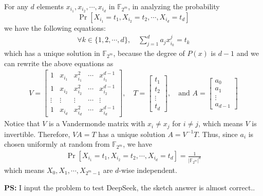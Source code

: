 \begin{answer}
        For any $d$ elements $x_{i_1}, x_{i_2}, \cdots, x_{i_d}$ in $\mathbb F_{2^m}$, in analyzing the probability
        \[
            \Pr[X_{i_1} = t_1, X_{i_2} = t_2, \cdots, X_{i_d} = t_d]
        \]
        we have the following equations: 
        \begin{align*}
            \forall k \in \{1, 2, \cdots, d\}, \quad \sum_{j=1}^{d} a_j x_{i_k}^j = t_k 
        \end{align*}
        which has a unique solution in $\mathbb F_{2^m}$, because the degree of $P(x)$ is $d-1$ and we can rewrite the above equations as
        \begin{align*}
            V = \begin{bmatrix}
                1 & x_{i_1} & x_{i_1}^2 & \cdots & x_{i_1}^{d-1} \\
                1 & x_{i_2} & x_{i_2}^2 & \cdots & x_{i_2}^{d-1} \\
                \vdots & \vdots & \vdots & \cdots & \vdots \\
                1 & x_{i_d} & x_{i_d}^2 & \cdots & x_{i_d}^{d-1}
            \end{bmatrix}, \quad T = \begin{bmatrix}
                t_1 \\
                t_2 \\
                \vdots \\
                t_d
            \end{bmatrix},
            \quad  \text{and } A = \begin{bmatrix}
                a_0 \\
                a_1 \\
                \vdots \\
                a_{d-1}
            \end{bmatrix}
        \end{align*}
        Notice that $V$ is a Vandermonde matrix with $x_{i} \neq x_{j}$ for $i \neq j$, which means $V$ is invertible.
        Therefore, $VA = T$ has a unique solution $A = V^{-1}T$. Thus, since $a_i$ is chosen uniformly at random from $\mathbb F_{2^m}$, we have
        \begin{align*}
            \Pr[X_{i_1} = t_1, X_{i_2} = t_2, \cdots, X_{i_d} = t_d] = \frac{1}{|\mathbb F_{2^m}|^d} 
        \end{align*}
        which means $X_0, X_1, \cdots, X_{2^m-1}$ are $d$-wise independent. \ed
  \end{answer}

  \textbf{PS:} I input the problem to test DeepSeek, the sketch answer is almost correct..
  